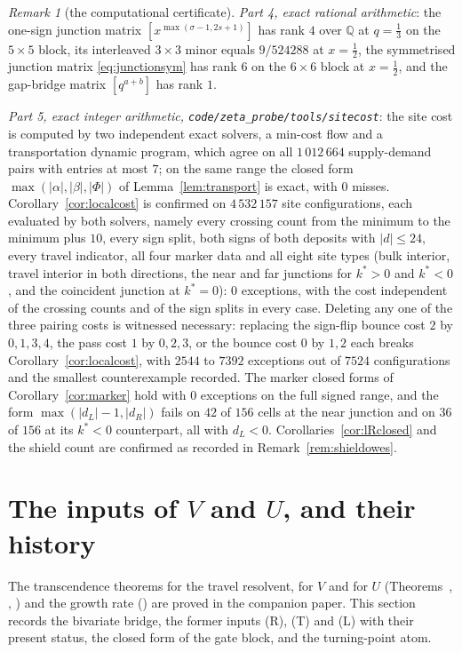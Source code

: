 \documentclass[11pt]{article}
\theoremstyle{plain}
\theoremstyle{definition}
\theoremstyle{remark}
\newtheorem{remark}[theorem]{Remark}
\newcommand{\Q}{\mathbb{Q}}
\begin{document}
\begin{remark}[the computational certificate]
\emph{Part 4, exact rational arithmetic}: the one-sign junction matrix
$[x^{\max(\sigma-1,2s+1)}]$ has rank $4$ over $\Q$ at $q=\tfrac13$ on the $5\times5$ block, its
interleaved $3\times3$ minor equals $9/524288$ at $x=\tfrac12$, the symmetrised junction matrix
\eqref{eq:junctionsym} has rank $6$ on the $6\times6$ block at $x=\tfrac12$, and the gap-bridge
matrix $[q^{a+b}]$ has rank $1$.

\emph{Part 5, exact integer arithmetic, \texttt{code/zeta\_probe/tools/sitecost}}: the site cost is
computed by two independent exact solvers, a min-cost flow and a transportation dynamic program,
which agree on all $1\,012\,664$ supply-demand pairs with entries at most $7$; on the same range the
closed form $\max(|\alpha|,|\beta|,|\Phi|)$ of Lemma~\ref{lem:transport} is exact, with $0$ misses.
Corollary~\ref{cor:localcost} is confirmed on $4\,532\,157$ site configurations, each evaluated by
both solvers, namely every crossing count from the minimum to the minimum plus $10$, every sign
split, both signs of both deposits with $|d|\le24$, every travel indicator, all four marker data and
all eight site types
(bulk interior, travel interior in both directions, the near and far junctions for $k^\ast>0$ and
$k^\ast<0$, and the coincident junction at $k^\ast=0$): $0$ exceptions, with the cost independent of
the crossing counts and of the sign splits in every case. Deleting any one of the three pairing
costs is witnessed necessary: replacing the sign-flip bounce cost $2$ by $0,1,3,4$, the pass cost
$1$ by $0,2,3$, or the bounce cost $0$ by $1,2$ each breaks
Corollary~\ref{cor:localcost}, with $2544$ to $7392$ exceptions out of $7524$ configurations and the
smallest counterexample recorded. The marker closed forms of Corollary~\ref{cor:marker} hold with
$0$ exceptions on the full signed range, and the form $\max(|d_L|-1,|d_R|)$ fails on $42$ of $156$
cells at the near junction and on $36$ of $156$ at its $k^\ast<0$ counterpart, all with $d_L<0$.
Corollaries~\ref{cor:lRclosed} and the shield count are confirmed as recorded in
Remark~\ref{rem:shieldowes}.
\end{remark}

\section{The inputs of $V$ and $U$, and their history}\label{sec:inputs}

The transcendence theorems for the travel resolvent, for $V$ and for $U$
(Theorems~{\cite[\textup{thm:travelres}]{Bonfioli2026bA}}, {\cite[\textup{thm:V}]{Bonfioli2026bA}}, {\cite[\textup{thm:U}]{Bonfioli2026bA}}) and the growth rate
({\cite[Corollary \textup{cor:beta}]{Bonfioli2026bA}}) are proved in the companion paper. This section records the bivariate
bridge, the former inputs \textup{(R)}, \textup{(T)} and \textup{(L)} with their present status,
the closed form of the gate block, and the turning-point atom.
\end{document}
